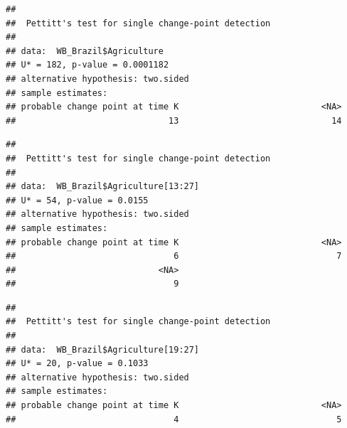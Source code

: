 \documentclass[12pt,]{article}
\newenvironment{Shaded}{\begin{snugshade}}{\end{snugshade}}
\newcommand{\KeywordTok}[1]{\textcolor[rgb]{0.13,0.29,0.53}{\textbf{#1}}}
\newcommand{\DecValTok}[1]{\textcolor[rgb]{0.00,0.00,0.81}{#1}}
\newcommand{\StringTok}[1]{\textcolor[rgb]{0.31,0.60,0.02}{#1}}
\newcommand{\CommentTok}[1]{\textcolor[rgb]{0.56,0.35,0.01}{\textit{#1}}}
\newcommand{\OperatorTok}[1]{\textcolor[rgb]{0.81,0.36,0.00}{\textbf{#1}}}
\newcommand{\NormalTok}[1]{#1}
\begin{document}
\begin{verbatim}
## 
##  Pettitt's test for single change-point detection
## 
## data:  WB_Brazil$Agriculture
## U* = 182, p-value = 0.0001182
## alternative hypothesis: two.sided
## sample estimates:
## probable change point at time K                            <NA> 
##                              13                              14
\end{verbatim}

\begin{Shaded}
\end{Shaded}

\begin{verbatim}
## 
##  Pettitt's test for single change-point detection
## 
## data:  WB_Brazil$Agriculture[13:27]
## U* = 54, p-value = 0.0155
## alternative hypothesis: two.sided
## sample estimates:
## probable change point at time K                            <NA> 
##                               6                               7 
##                            <NA> 
##                               9
\end{verbatim}

\begin{Shaded}
\end{Shaded}

\begin{verbatim}
## 
##  Pettitt's test for single change-point detection
## 
## data:  WB_Brazil$Agriculture[19:27]
## U* = 20, p-value = 0.1033
## alternative hypothesis: two.sided
## sample estimates:
## probable change point at time K                            <NA> 
##                               4                               5
\end{verbatim}

\begin{Shaded}
\end{Shaded}
\end{document}
